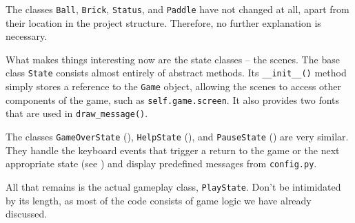 The classes \texttt{Ball}, \texttt{Brick}, \texttt{Status}, and \texttt{Paddle} have not changed at all, apart from their location in the project structure. Therefore, no further explanation is necessary.

What makes things interesting now are the state classes -- the scenes. The base class \texttt{State} consists almost entirely of abstract methods. Its \texttt{\_\_init\_\_()} method simply stores a reference to the \texttt{Game} object, allowing the scenes to access other components of the game, such as \texttt{self.game.screen}. It also provides two fonts that are used in \texttt{draw\_message()}.


The classes \texttt{GameOverState} (), \texttt{HelpState} (), and \texttt{PauseState} () are very similar. They handle the keyboard events that trigger a return to the game or the next appropriate state (see ) and display predefined messages from \texttt{config.py}.




All that remains is the actual gameplay class, \texttt{PlayState}. Don't be intimidated by its length, as most of the code consists of game logic we have already discussed.


